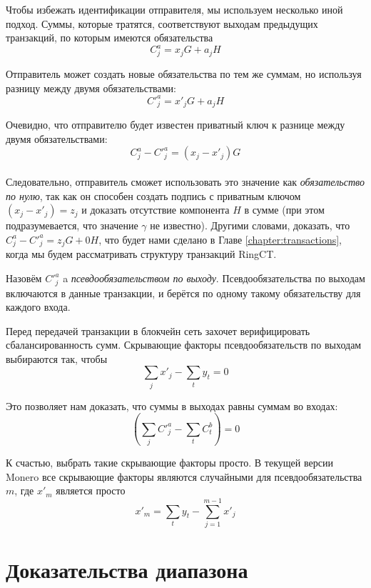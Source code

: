 Чтобы избежать идентификации отправителя, мы используем несколько иной подход. Суммы, которые тратятся, соответствуют выходам предыдущих транзакций, по которым имеются обязательства\vspace{.175cm}
\[C^a_{j} = x_j G + a_j H\]

Отправитель может создать новые обязательства по тем же суммам, но используя разницу между двумя обязательствами:
\[C'^a_{j} = x'_j G + a_j H\]

Очевидно, что отправителю будет известен приватный ключ к разнице между двумя обяза\-тельствами: \vspace{.175cm}
\[C^a_{j} - C'^a_{j} = (x_j - x'_j) G\]\\
Следовательно, отправитель сможет использовать это значение как {\em обязательство по нулю}, так как он способен создать подпись с приватным ключом $(x_j - x'_j) = z_j$ и доказать отсутствие компонента $H$ в сумме (при этом подразумевается, что значение $\gamma$ не известно). Другими словами, доказать, что $C^a_{j} - C'^a_{j} = z_j G + 0H$, что будет нами сделано в Главе \ref{chapter:transactions}, когда мы будем рассматривать структуру транзакций RingCT.

Назовём $C'^a_j$ a {\em псевдообязательством по выходу}. Псевдообязательства по выходам включают\-ся в данные транзакции, и берётся по одному такому обязательству для каждого входа.

Перед передачей транзакции в блокчейн сеть захочет верифицировать сбалансированность сумм. Скрывающие факторы псевдообязательств по выходам выбираются так, чтобы\vspace{.175cm}
\[\sum_j x'_j  - \sum_t y_t = 0\]

Это позволяет нам доказать, что суммы в выходах равны суммам во входах:\vspace{.175cm}
\[(\sum_j C'^a_{j} - \sum_t C^b_{t}) = 0\]

К счастью, выбрать такие скрывающие факторы просто. В текущей версии Monero все скрывающие факторы являются случайными для псевдообязательства $m$\nth, где $x'_m$ является просто
\[x'_m = \sum_t y_t - \sum_{j=1}^{m-1} x'_j\]



\section{Доказательства диапазона}
\label{sec:range_proofs}


